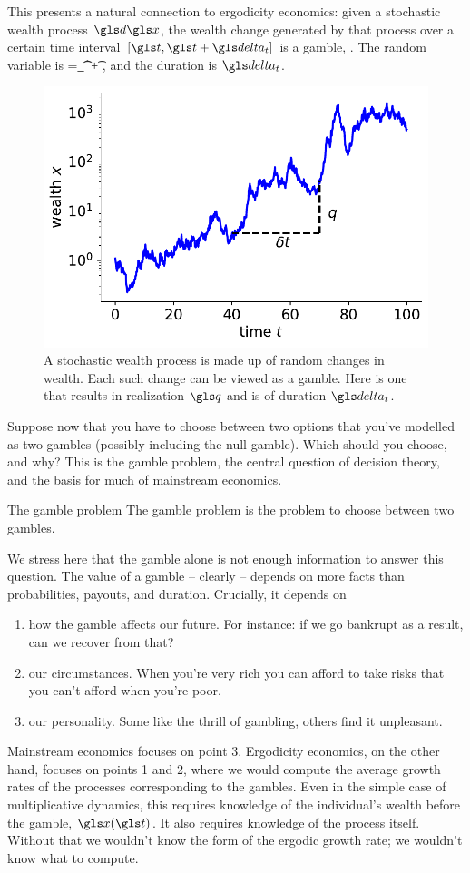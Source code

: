 This presents a natural connection to ergodicity economics: given a stochastic wealth 
process $\gd\x$, the wealth change generated by that process over a certain time 
interval $[\t,\t+\dt]$ is a gamble, . The random variable is 
\be
\Q=\int_\t^{\t+\dt} \gd\x,
\ee and the duration is $\dt$.

\begin{figure}
\centering
\includegraphics[width=.5\textwidth]{./chapter_risky/figs/gamble_process.pdf}
\caption{\small A stochastic wealth process is made up of random changes in wealth. Each such change can be viewed as a gamble. Here is one that results in realization $\q$ and is of duration $\dt$.}
\end{figure}

Suppose now that you have to choose between two options that you've modelled 
as two gambles (possibly including the null gamble). Which should you choose, 
and why? This is the gamble problem, the central question of decision theory, and 
the basis for much of mainstream economics.

\begin{defn}{The gamble problem}
The gamble problem is the problem to choose between two gambles.
\end{defn}

We stress here that the gamble alone is not enough information to answer this question. 
The value of a gamble -- clearly -- depends on more facts than probabilities, payouts, and duration. Crucially, it depends on 
\begin{enumerate}
\item
how the gamble affects our future. For instance: if we go bankrupt as a result, can we recover from that?
\item
our circumstances. When you're very rich you can afford to take risks that you can't afford when you're poor. 
\item
our personality. Some like the thrill of gambling, others find it unpleasant.
\end{enumerate}
Mainstream economics focuses on point 3. Ergodicity economics, on the other hand, focuses on points 1 and 2, 
where we would compute the average growth rates of the processes corresponding to the gambles. 
Even in the simple case of multiplicative dynamics, this requires knowledge of the individual's wealth 
before the gamble, $\x(\t)$. It also requires knowledge of the process itself. Without that we wouldn't 
know the form of the ergodic growth rate; we wouldn't know what to compute. 

